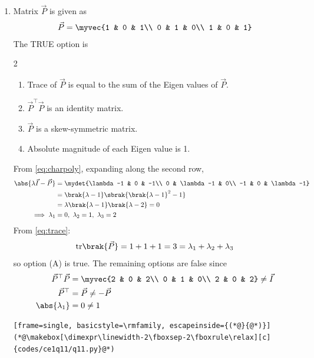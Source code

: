 \begin{enumerate}[label=\thesubsection.\arabic*, ref=\thesubsection.\theenumi, itemsep=0pt, leftmargin=*]
\begin{lstlisting}[frame=single, basicstyle=\rmfamily, escapeinside={(*@}{@*)}]
(*@\makebox[\dimexpr\linewidth-2\fboxsep-2\fboxrule\relax][c]{codes/ce1/q07.py}@*)
\end{lstlisting}
\begin{lstlisting}[frame=single, basicstyle=\rmfamily, escapeinside={(*@}{@*)}]
(*@\makebox[\dimexpr\linewidth-2\fboxsep-2\fboxrule\relax][c]{figs/q07.py}@*)
\end{lstlisting}
\item Matrix $\vec{P}$ is given as
\begin{align}
\vec{P} = \myvec{1 & 0 & 1\\ 0 & 1 & 0\\ 1 & 0 & 1}
\end{align}
The TRUE option is \gate
\begin{multicols}{2}
\begin{enumerate}[label=\alph*), itemsep=0pt]
\item Trace of $\vec{P}$ is equal to the sum of the Eigen values of $\vec{P}$.
\item $\vec{P}^\top\vec{P}$ is an identity matrix.
\item $\vec{P}$ is a skew-symmetric matrix.
\item Absolute magnitude of each Eigen value is 1.
\end{enumerate}
\end{multicols}
\solution From \eqref{eq:charpoly}, expanding along the second row,
\begin{align}
\abs{\lambda\vec{I} - \vec{P}} &= \mydet{\lambda-1 & 0 & -1\\ 0 & \lambda-1 & 0\\ -1 & 0 & \lambda-1}\\
&= \brak{\lambda-1}\sbrak{\brak{\lambda-1}^2 - 1}\\
&= \lambda\brak{\lambda-1}\brak{\lambda-2} = 0\\
\implies \lambda_1 &= 0,\ \lambda_2 = 1,\ \lambda_3 = 2
\end{align}
From \eqref{eq:trace}:
\begin{align}
\text{tr}\brak{\vec{P}} = 1+1+1 = 3 = \lambda_1 + \lambda_2 + \lambda_3
\end{align}
so option (A) is true. The remaining options are false since
\begin{align}
\vec{P}^\top\vec{P} &= \myvec{2 & 0 & 2\\ 0 & 1 & 0\\ 2 & 0 & 2} \neq \vec{I}\\
\vec{P}^\top &= \vec{P} \neq -\vec{P}\\
\abs{\lambda_1} &= 0 \neq 1
\end{align}
\begin{lstlisting}[frame=single, basicstyle=\rmfamily, escapeinside={(*@}{@*)}]
(*@\makebox[\dimexpr\linewidth-2\fboxsep-2\fboxrule\relax][c]{codes/ce1q11/q11.py}@*)
\end{lstlisting}


\end{enumerate}
